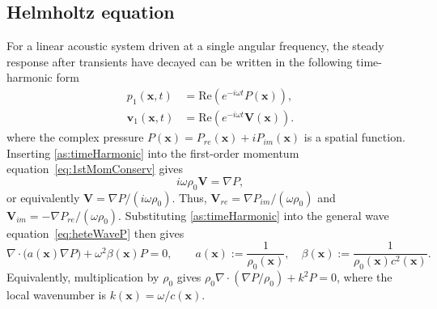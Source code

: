 \documentclass[final,12pt,nopreprintline,longtitle]{elsarticle}
\renewcommand{\v}{\mathbf{v}}
\newcommand{\V}{\mathbf{V}}
\newcommand{\x}{\mathbf{x}}
\newcommand{\betaac}{\beta}
\begin{document}
\subsection{Helmholtz equation}
For a linear acoustic system driven at a single angular frequency, the
steady response after transients have decayed can be written in the following
time-harmonic form \cite{morse1986theoretical}
\begin{equation}
    \begin{aligned}
        p_1(\x,t) &= \mathrm{Re}(e^{-i\omega t}P(\x)),\\
        \v_1(\x,t) &= \mathrm{Re}(e^{-i\omega t}\V(\x)).
    \end{aligned}
    \label{as:timeHarmonic}
\end{equation}
where the complex pressure
$P(\x)=P_{re}(\x)+iP_{im}(\x)$ is a spatial function.
Inserting \cref{as:timeHarmonic} into the first-order momentum
equation~\eqref{eq:1stMomConserv} gives
\begin{equation}
    i\omega\rho_0 \V = \nabla P,
    \label{eq:velocityComplex}
\end{equation}
or equivalently $\V=\nabla P/(i\omega\rho_0)$.  Thus,
$\V_{re}=\nabla P_{im}/(\omega\rho_0)$ and
$\V_{im}=-\nabla P_{re}/(\omega\rho_0)$.
Substituting \cref{as:timeHarmonic} into the general wave
equation~\eqref{eq:heteWaveP} then gives
\begin{equation}
    \nabla\cdot\bigl(a(\x)\nabla P\bigr)
    +\omega^2\betaac(\x)P=0,
    \qquad
    a(\x):=\frac{1}{\rho_0(\x)},\quad
    \betaac(\x):=\frac{1}{\rho_0(\x)c^2(\x)}.
    \label{eq:heteHelmholtz}
\end{equation}
Equivalently, multiplication by $\rho_0$ gives
$\rho_0\nabla\cdot(\nabla P/\rho_0)+k^2P=0$, where the local wavenumber is
$k(\x)=\omega/c(\x)$.
\end{document}
